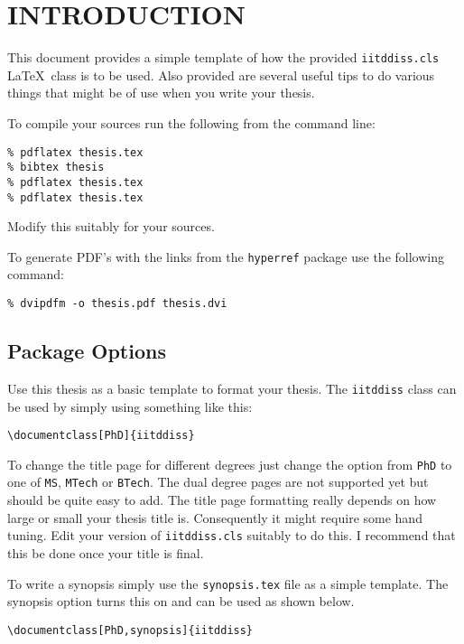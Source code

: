 \documentclass[Other]{iitddiss}
\begin{document}
\pagebreak
\clearpage




\chapter{INTRODUCTION}
\label{chap:intro}

This document provides a simple template of how the provided
\verb+iitddiss.cls+ \LaTeX\ class is to be used.  Also provided are
several useful tips to do various things that might be of use when you
write your thesis.

To compile your sources run the following from the command line:
\begin{verbatim}
% pdflatex thesis.tex
% bibtex thesis
% pdflatex thesis.tex
% pdflatex thesis.tex
\end{verbatim}
Modify this suitably for your sources.

To generate PDF's with the links from the \verb+hyperref+ package use
the following command:
\begin{verbatim}
% dvipdfm -o thesis.pdf thesis.dvi
\end{verbatim}

\section{Package Options}

Use this thesis as a basic template to format your thesis.  The
\verb+iitddiss+ class can be used by simply using something like this:
\begin{verbatim}
\documentclass[PhD]{iitddiss}
\end{verbatim}

To change the title page for different degrees just change the option
from \verb+PhD+ to one of \verb+MS+, \verb+MTech+ or \verb+BTech+.
The dual degree pages are not supported yet but should be quite easy
to add.  The title page formatting really depends on how large or
small your thesis title is.  Consequently it might require some hand
tuning.  Edit your version of \verb+iitddiss.cls+ suitably to do this.
I recommend that this be done once your title is final.

To write a synopsis simply use the \verb+synopsis.tex+ file as a
simple template.  The synopsis option turns this on and can be used as
shown below.
\begin{verbatim}
\documentclass[PhD,synopsis]{iitddiss}
\end{verbatim}
\end{document}
